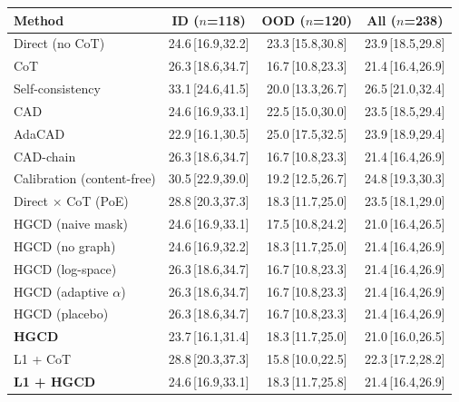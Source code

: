 \begin{tabular}{lccc}
\toprule
Method & ID ($n$=118) & OOD ($n$=120) & All ($n$=238) \\
\midrule
Direct (no CoT) & 24.6\,{\scriptsize[16.9,32.2]} & 23.3\,{\scriptsize[15.8,30.8]} & 23.9\,{\scriptsize[18.5,29.8]} \\
CoT & 26.3\,{\scriptsize[18.6,34.7]} & 16.7\,{\scriptsize[10.8,23.3]} & 21.4\,{\scriptsize[16.4,26.9]} \\
Self-consistency & 33.1\,{\scriptsize[24.6,41.5]} & 20.0\,{\scriptsize[13.3,26.7]} & 26.5\,{\scriptsize[21.0,32.4]} \\
CAD & 24.6\,{\scriptsize[16.9,33.1]} & 22.5\,{\scriptsize[15.0,30.0]} & 23.5\,{\scriptsize[18.5,29.4]} \\
AdaCAD & 22.9\,{\scriptsize[16.1,30.5]} & 25.0\,{\scriptsize[17.5,32.5]} & 23.9\,{\scriptsize[18.9,29.4]} \\
CAD-chain & 26.3\,{\scriptsize[18.6,34.7]} & 16.7\,{\scriptsize[10.8,23.3]} & 21.4\,{\scriptsize[16.4,26.9]} \\
Calibration (content-free) & 30.5\,{\scriptsize[22.9,39.0]} & 19.2\,{\scriptsize[12.5,26.7]} & 24.8\,{\scriptsize[19.3,30.3]} \\
Direct $\times$ CoT (PoE) & 28.8\,{\scriptsize[20.3,37.3]} & 18.3\,{\scriptsize[11.7,25.0]} & 23.5\,{\scriptsize[18.1,29.0]} \\
HGCD (naive mask) & 24.6\,{\scriptsize[16.9,33.1]} & 17.5\,{\scriptsize[10.8,24.2]} & 21.0\,{\scriptsize[16.4,26.5]} \\
HGCD (no graph) & 24.6\,{\scriptsize[16.9,32.2]} & 18.3\,{\scriptsize[11.7,25.0]} & 21.4\,{\scriptsize[16.4,26.9]} \\
HGCD (log-space) & 26.3\,{\scriptsize[18.6,34.7]} & 16.7\,{\scriptsize[10.8,23.3]} & 21.4\,{\scriptsize[16.4,26.9]} \\
HGCD (adaptive $\alpha$) & 26.3\,{\scriptsize[18.6,34.7]} & 16.7\,{\scriptsize[10.8,23.3]} & 21.4\,{\scriptsize[16.4,26.9]} \\
HGCD (placebo) & 26.3\,{\scriptsize[18.6,34.7]} & 16.7\,{\scriptsize[10.8,23.3]} & 21.4\,{\scriptsize[16.4,26.9]} \\
\textbf{HGCD} & 23.7\,{\scriptsize[16.1,31.4]} & 18.3\,{\scriptsize[11.7,25.0]} & 21.0\,{\scriptsize[16.0,26.5]} \\
L1 + CoT & 28.8\,{\scriptsize[20.3,37.3]} & 15.8\,{\scriptsize[10.0,22.5]} & 22.3\,{\scriptsize[17.2,28.2]} \\
\textbf{L1 + HGCD} & 24.6\,{\scriptsize[16.9,33.1]} & 18.3\,{\scriptsize[11.7,25.8]} & 21.4\,{\scriptsize[16.4,26.9]} \\
\bottomrule
\end{tabular}

